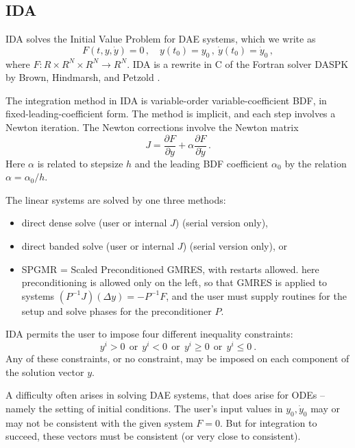 \subsection{IDA}\label{ss:IDA}

IDA solves the  Initial Value Problem for DAE systems, which we write as
\begin{equation}\label{e:DAE}
  F(t,y,{\dot y}) = 0 \, ,\quad y(t_0) = y_0 \, ,~ {\dot y}(t_0) = {\dot y}_0 \, ,
\end{equation}
where  $F:R \times R^N \times R^N \rightarrow R^N$.
IDA is a rewrite in C of the Fortran solver DASPK by Brown, Hindmarsh,
and Petzold \cite{BHP:94}.

The integration method in IDA is variable-order variable-coefficient
BDF, in fixed-leading-coefficient form.  The method is implicit, and
each step involves a Newton iteration.  The Newton corrections involve
the Newton matrix
\begin{equation}\label{e:DAE_Jacobian}
  J = \frac{\partial F}{\partial y} + \alpha \frac{\partial F}{\partial {\dot y}} \, . 
\end{equation}
Here $\alpha$ is related to stepsize $h$ and the leading BDF
coefficient $\alpha_0$ by the relation $\alpha = \alpha_0/h$.

The linear systems are solved by one three methods:
\begin{itemize}
\item direct dense solve (user or internal $J$) (serial version only),
\item direct banded solve (user or internal $J$) (serial version
      only), or
\item SPGMR = Scaled Preconditioned GMRES, with restarts allowed.
      here preconditioning is allowed only on the left, so that GMRES
      is applied to systems $(P^{-1}J)(\Delta y) = -P^{-1}F$, and
      the user must supply routines for the setup and solve phases for
      the preconditioner $P$.
\end{itemize}

IDA permits the user to impose four different inequality constraints:
\begin{equation}
  y^i > 0~~ \mbox{or} ~~ y^i < 0~~ \mbox{or} ~~y^i \geq 0~~
  \mbox{or} ~~y^i \leq 0 ~.
\end{equation}
Any of these constraints, or no constraint, may be imposed on each
component of the solution vector $y$.

A difficulty often arises in solving DAE systems, that does arise for
ODEs -- namely the setting of initial conditions.  The user's input
values in $y_0, {\dot y}_0$ may or may not be consistent with the given
system $F = 0$.  But for integration to succeed, these vectors must
be consistent (or very close to consistent).

